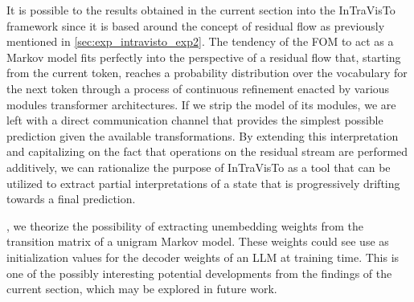 It is possible to  the results obtained in the current section into the InTraVisTo framework since it is based around the concept of residual flow as previously mentioned in \cref{sec:exp_intravisto_exp2}.
The tendency of the FOM to act as a Markov model fits perfectly into the perspective of a residual flow that, starting from the current token, reaches a probability distribution over the vocabulary for the next token through a process of continuous refinement enacted by various modules  transformer architectures.
If we strip the model of its modules, we are left with a direct communication channel that provides the simplest possible prediction given the available transformations.
By extending this interpretation and capitalizing on the fact that operations on the residual stream are performed additively, we can rationalize the purpose of InTraVisTo as a tool that can be utilized to extract partial interpretations of a state that is progressively drifting towards a final prediction.

, we theorize the possibility of extracting unembedding weights from the transition matrix of a unigram Markov model.
These weights could see use as initialization values for the decoder weights of an LLM at training time.
This is one of the possibly interesting potential developments  from the findings of the current section, which may be explored in future work.
